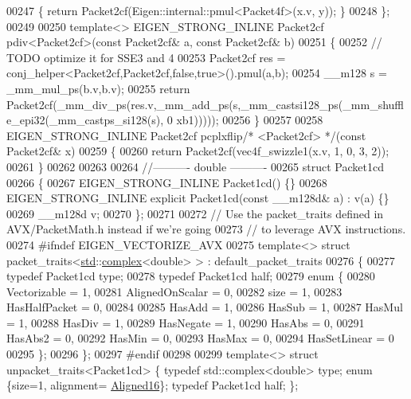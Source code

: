 \begin{DoxyCode}
00247 \textcolor{keyword}{  }\{ \textcolor{keywordflow}{return} Packet2cf(Eigen::internal::pmul<Packet4f>(x.v, y)); \}
00248 \};
00249 
00250 \textcolor{keyword}{template}<> EIGEN\_STRONG\_INLINE Packet2cf pdiv<Packet2cf>(\textcolor{keyword}{const} Packet2cf& a, \textcolor{keyword}{const} Packet2cf& b)
00251 \{
00252   \textcolor{comment}{// TODO optimize it for SSE3 and 4}
00253   Packet2cf res = conj\_helper<Packet2cf,Packet2cf,false,true>().pmul(a,b);
00254   \_\_m128 s = \_mm\_mul\_ps(b.v,b.v);
00255   \textcolor{keywordflow}{return} Packet2cf(\_mm\_div\_ps(res.v,\_mm\_add\_ps(s,\_mm\_castsi128\_ps(\_mm\_shuffle\_epi32(\_mm\_castps\_si128(s), 0
      xb1)))));
00256 \}
00257 
00258 EIGEN\_STRONG\_INLINE Packet2cf pcplxflip\textcolor{comment}{/* <Packet2cf> */}(\textcolor{keyword}{const} Packet2cf& x)
00259 \{
00260   \textcolor{keywordflow}{return} Packet2cf(vec4f\_swizzle1(x.v, 1, 0, 3, 2));
00261 \}
00262 
00263 
00264 \textcolor{comment}{//---------- double ----------}
00265 \textcolor{keyword}{struct }Packet1cd
00266 \{
00267   EIGEN\_STRONG\_INLINE Packet1cd() \{\}
00268   EIGEN\_STRONG\_INLINE \textcolor{keyword}{explicit} Packet1cd(\textcolor{keyword}{const} \_\_m128d& a) : v(a) \{\}
00269   \_\_m128d  v;
00270 \};
00271 
00272 \textcolor{comment}{// Use the packet\_traits defined in AVX/PacketMath.h instead if we're going}
00273 \textcolor{comment}{// to leverage AVX instructions.}
00274 \textcolor{preprocessor}{#ifndef EIGEN\_VECTORIZE\_AVX}
00275 \textcolor{keyword}{template}<> \textcolor{keyword}{struct }packet\_traits<\hyperlink{namespacestd}{std}::\hyperlink{structcomplex}{complex}<double> >  : default\_packet\_traits
00276 \{
00277   \textcolor{keyword}{typedef} Packet1cd type;
00278   \textcolor{keyword}{typedef} Packet1cd half;
00279   \textcolor{keyword}{enum} \{
00280     Vectorizable = 1,
00281     AlignedOnScalar = 0,
00282     size = 1,
00283     HasHalfPacket = 0,
00284 
00285     HasAdd    = 1,
00286     HasSub    = 1,
00287     HasMul    = 1,
00288     HasDiv    = 1,
00289     HasNegate = 1,
00290     HasAbs    = 0,
00291     HasAbs2   = 0,
00292     HasMin    = 0,
00293     HasMax    = 0,
00294     HasSetLinear = 0
00295   \};
00296 \};
00297 \textcolor{preprocessor}{#endif}
00298 
00299 \textcolor{keyword}{template}<> \textcolor{keyword}{struct }unpacket\_traits<Packet1cd> \{ \textcolor{keyword}{typedef} std::complex<double> type; \textcolor{keyword}{enum} \{size=1, alignment=
      \hyperlink{group__enums_gga45fe06e29902b7a2773de05ba27b47a1af8e2bf74b04c02199f62c5e3c06dbfcc}{Aligned16}\}; \textcolor{keyword}{typedef} Packet1cd half; \};

\end{DoxyCode}

